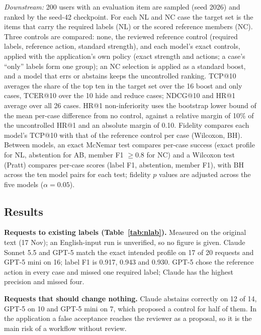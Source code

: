 \documentclass[conference]{IEEEtran}
\begin{document}
\emph{Downstream:} 200 users with an evaluation item are sampled (seed 2026) and ranked by the seed-42 checkpoint. For each NL and NC case the target set is the items that carry the required labels (NL) or the scored reference members (NC). Three controls are compared: none, the reviewed reference control (required labels, reference action, standard strength), and each model's exact controls, applied with the application's own policy (exact strength and actions; a case's ``only'' labels form one group); an NC selection is applied as a standard boost, and a model that errs or abstains keeps the uncontrolled ranking. TCP@10 averages the share of the top ten in the target set over the 16 boost and only cases, TCER@10 over the 10 hide and reduce cases; NDCG@10 and HR@1 average over all 26 cases. HR@1 non-inferiority uses the bootstrap lower bound of the mean per-case difference from no control, against a relative margin of 10\% of the uncontrolled HR@1 and an absolute margin of 0.10. Fidelity compares each model's TCP@10 with that of the reference control per case (Wilcoxon, BH). Between models, an exact McNemar test compares per-case success (exact profile for NL, abstention for AB, member F1 $\geq0.8$ for NC) and a Wilcoxon test (Pratt) compares per-case scores (label F1, abstention, member F1), with BH across the ten model pairs for each test; fidelity $p$ values are adjusted across the five models ($\alpha=0.05$).

\subsection{Results}\label{sec:e3res}
\textbf{Requests to existing labels (Table~\ref{tab:nlab}).} Measured on the original text (17 Nov); an English-input run is unverified, so no figure is given. Claude Sonnet 5.5 and GPT-5 match the exact intended profile on 17 of 20 requests and GPT-5 mini on 16; label F1 is 0.917, 0.943 and 0.930. GPT-5 chose the reference action in every case and missed one required label; Claude has the highest precision and missed four.

\textbf{Requests that should change nothing.} Claude abstains correctly on 12 of 14, GPT-5 on 10 and GPT-5 mini on 7, which proposed a control for half of them. In the application a false acceptance reaches the reviewer as a proposal, so it is the main risk of a workflow without review.
\end{document}
